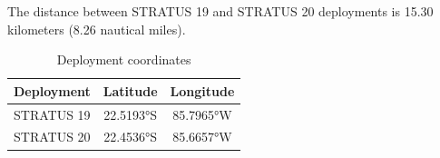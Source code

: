 
The distance between STRATUS 19 and STRATUS 20 deployments is 15.30 kilometers (8.26 nautical miles).

\begin{table}[ht]
\centering
\caption{Deployment coordinates}
\begin{tabular}{lcc}
\hline
\textbf{Deployment} & \textbf{Latitude} & \textbf{Longitude} \\
\hline
STRATUS 19 & 22.5193°S & 85.7965°W \\
STRATUS 20 & 22.4536°S & 85.6657°W \\
\hline
\end{tabular}
\end{table}
